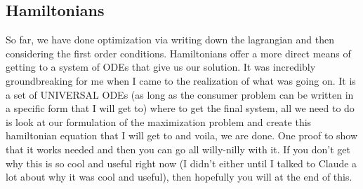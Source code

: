 \documentclass[11pt,english]{article}
\begin{document}
\subsection{Hamiltonians}
So far, we have done optimization via writing down the lagrangian and then considering the first order conditions. Hamiltonians offer a more direct means of getting to a system of ODEs that give us our solution. It was incredibly groundbreaking for me when I came to the realization of what was going on. It is a set of UNIVERSAL ODEs (as long as the consumer problem can be written in a specific form that I will get to) where to get the final system, all we need to do is look at our formulation of the maximization problem and create this hamiltonian equation that I will get to and voila, we are done. One proof to show that it works needed and then you can go all willy-nilly with it. If you don't get why this is so cool and useful right now (I didn't either until I talked to Claude a lot about why it was cool and useful), then hopefully you will at the end of this.
\end{document}
